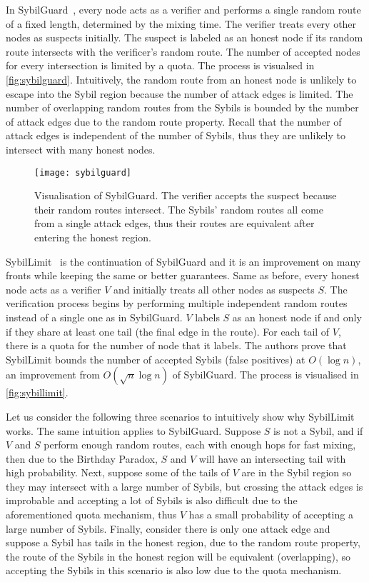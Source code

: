 In SybilGuard~\cite{yu2006sybilguard}, every node acts as a verifier and
performs a single random route of a fixed length, determined by the mixing time.
The verifier treats every other nodes as suspects initially. The suspect is
labeled as an honest node if its random route intersects with the verificer's
random route. The number of accepted nodes for every intersection is limited by
a quota. The process is visualsed in \autoref{fig:sybilguard}. Intuitively, the
random route from an honest node is unlikely to escape into the Sybil region
because the number of attack edges is limited. The number of overlapping random
routes from the Sybils is bounded by the number of attack edges due to the
random route property. Recall that the number of attack edges is independent of
the number of Sybils, thus they are unlikely to intersect with many honest
nodes.

\begin{figure}
  \centering
  \texttt{[image: sybilguard]}
  \caption{Visualisation of SybilGuard. The verifier accepts the suspect because
    their random routes intersect. The Sybils' random routes all come from a
    single attack edges, thus their routes are equivalent after entering the
    honest region.}
  \label{fig:sybilguard}
\end{figure}

SybilLimit~\cite{yu2008sybillimit} is the continuation of SybilGuard and it is
an improvement on many fronts while keeping the same or better guarantees. Same
as before, every honest node acts as a verifier $V$ and initially treats all
other nodes as suspects $S$. The verification process begins by performing
multiple independent random routes instead of a single one as in SybilGuard. $V$
labels $S$ as an honest node if and only if they share at least one tail (the
final edge in the route). For each tail of $V$, there is a quota for the number
of node that it labels. The authors prove that SybilLimit bounds the number of
accepted Sybils (false positives) at $O(\log{n})$, an improvement from
$O(\sqrt{n} \log{n})$ of SybilGuard. The process is visualised in
\autoref{fig:sybillimit}.

Let us consider the following three scenarios to intuitively show why SybilLimit
works. The same intuition applies to SybilGuard. Suppose $S$ is not a Sybil, and
if $V$ and $S$ perform enough random routes, each with enough hops for fast
mixing, then due to the Birthday Paradox, $S$ and $V$ will have an intersecting
tail with high probability. Next, suppose some of the tails of $V$ are in the
Sybil region so they may intersect with a large number of Sybils, but crossing
the attack edges is improbable and accepting a lot of Sybils is also difficult
due to the aforementioned quota mechanism, thus $V$ has a small probability of
accepting a large number of Sybils. Finally, consider there is only one attack
edge and suppose a Sybil has tails in the honest region, due to the random route
property, the route of the Sybils in the honest region will be equivalent
(overlapping), so accepting the Sybils in this scenario is also low due to the
quota mechanism.

